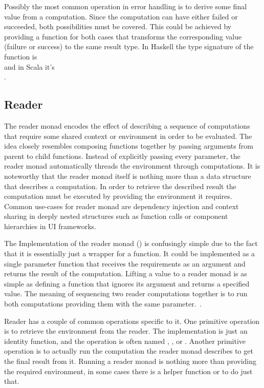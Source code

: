 Possibly the most common operation in error handling is to derive some final value from a computation. Since the computation can have either failed or succeeded, both possibilities must be covered. This could be achieved by providing a function for both cases that transforms the corresponding value (failure or success) to the same result type. In Haskell the type signature of the function is \\ and in Scala it's \\.


\subsection{Reader}
The reader monad encodes the effect of describing a sequence of computations that require some shared context or environment in order to be evaluated. The idea closely resembles composing functions together by passing arguments from parent to child functions. Instead of explicitly passing every parameter, the reader monad automatically threads the environment through computations. It is noteworthy that the reader monad itself is nothing more than a data structure that describes a computation. In order to retrieve the described result the computation must be executed by providing the environment it requires. Common use-cases for reader monad are dependency injection and context sharing in deeply nested structures such as function calls or component hierarchies in UI frameworks.



The Implementation of the reader monad () is confusingly simple due to the fact that it is essentially just a wrapper for a function. It could be implemented as a single parameter function that receives the requirements as an argument and returns the result of the computation. Lifting a value to a reader monad is as simple as defining a function that ignores its argument and returns a specified value. The meaning of sequencing two reader computations together is to run both computations providing them with the same parameter.~\cite{fp-overloading-ho-polymorphism}.

Reader has a couple of common operations specific to it. One primitive operation is to retrieve the environment from the reader. The implementation is just an identity function, and the operation is often named , , or . Another primitive operation is to actually run the computation the reader monad describes to get the final result from it. Running a reader monad is nothing more than providing the required environment, in some cases there is a helper function  or  to do just that.


